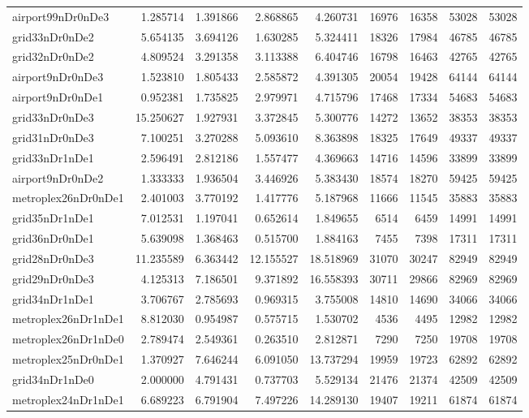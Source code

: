 \begin{longtable}{|l|r|r|r|r|r|r|r|r|}
airport99nDr0nDe3 & 1.285714 & 1.391866 & 2.868865 & 4.260731 & 16976 & 16358 & 53028 & 53028 \\
grid33nDr0nDe2 & 5.654135 & 3.694126 & 1.630285 & 5.324411 & 18326 & 17984 & 46785 & 46785 \\
grid32nDr0nDe2 & 4.809524 & 3.291358 & 3.113388 & 6.404746 & 16798 & 16463 & 42765 & 42765 \\
airport9nDr0nDe3 & 1.523810 & 1.805433 & 2.585872 & 4.391305 & 20054 & 19428 & 64144 & 64144 \\
airport9nDr0nDe1 & 0.952381 & 1.735825 & 2.979971 & 4.715796 & 17468 & 17334 & 54683 & 54683 \\
grid33nDr0nDe3 & 15.250627 & 1.927931 & 3.372845 & 5.300776 & 14272 & 13652 & 38353 & 38353 \\
grid31nDr0nDe3 & 7.100251 & 3.270288 & 5.093610 & 8.363898 & 18325 & 17649 & 49337 & 49337 \\
grid33nDr1nDe1 & 2.596491 & 2.812186 & 1.557477 & 4.369663 & 14716 & 14596 & 33899 & 33899 \\
airport9nDr0nDe2 & 1.333333 & 1.936504 & 3.446926 & 5.383430 & 18574 & 18270 & 59425 & 59425 \\
metroplex26nDr0nDe1 & 2.401003 & 3.770192 & 1.417776 & 5.187968 & 11666 & 11545 & 35883 & 35883 \\
grid35nDr1nDe1 & 7.012531 & 1.197041 & 0.652614 & 1.849655 & 6514 & 6459 & 14991 & 14991 \\
grid36nDr0nDe1 & 5.639098 & 1.368463 & 0.515700 & 1.884163 & 7455 & 7398 & 17311 & 17311 \\
grid28nDr0nDe3 & 11.235589 & 6.363442 & 12.155527 & 18.518969 & 31070 & 30247 & 82949 & 82949 \\
grid29nDr0nDe3 & 4.125313 & 7.186501 & 9.371892 & 16.558393 & 30711 & 29866 & 82969 & 82969 \\
grid34nDr1nDe1 & 3.706767 & 2.785693 & 0.969315 & 3.755008 & 14810 & 14690 & 34066 & 34066 \\
metroplex26nDr1nDe1 & 8.812030 & 0.954987 & 0.575715 & 1.530702 & 4536 & 4495 & 12982 & 12982 \\
metroplex26nDr1nDe0 & 2.789474 & 2.549361 & 0.263510 & 2.812871 & 7290 & 7250 & 19708 & 19708 \\
metroplex25nDr0nDe1 & 1.370927 & 7.646244 & 6.091050 & 13.737294 & 19959 & 19723 & 62892 & 62892 \\
grid34nDr1nDe0 & 2.000000 & 4.791431 & 0.737703 & 5.529134 & 21476 & 21374 & 42509 & 42509 \\
metroplex24nDr1nDe1 & 6.689223 & 6.791904 & 7.497226 & 14.289130 & 19407 & 19211 & 61874 & 61874 \\

\end{longtable}

